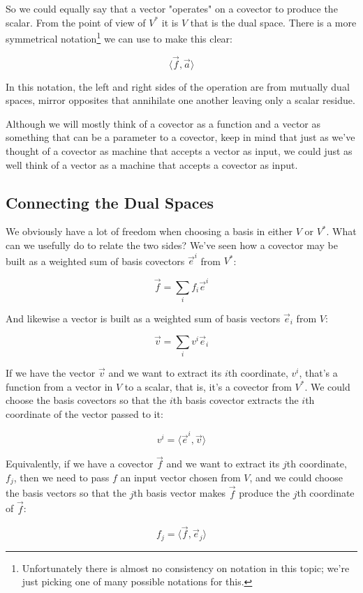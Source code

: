So we could equally say that a vector "operates" on a covector to produce the scalar. From the point of view of $V^*$ it is $V$ that is the dual space. There is a more symmetrical notation\footnote{Unfortunately there is almost no consistency on notation in this topic; we're just picking one of many possible notations for this.} we can use to make this clear:

$$\langle \vec{f},\vec{a}\rangle$$

In this notation, the left and right sides of the operation are from mutually dual spaces, mirror opposites that annihilate one another leaving only a scalar residue.

Although we will mostly think of a covector as a function and a vector as something that can be a parameter to a covector, keep in mind that just as we've thought of a covector as machine that accepts a vector as input, we could just as well think of a vector as a machine that accepts a covector as input.

\subsection{Connecting the Dual Spaces}

We obviously have a lot of freedom when choosing a basis in either $V$ or $V^*$. What can we usefully do to relate the two sides? We've seen how a covector may be built as a weighted sum of basis covectors $\vec{e}^i$ from $V^*$:

$$
\vec{f} = \sum_i f_i \vec{e}^i
$$

And likewise a vector is built as a weighted sum of basis vectors $\vec{e}_i$ from $V$:

$$
\vec{v} = \sum_i v^i \vec{e}_i
$$

If we have the vector $\vec{v}$ and we want to extract its $i$th coordinate, $v^i$, that's a function from a vector in $V$ to a scalar, that is, it's a covector from $V^*$. We could choose the basis covectors so that the $i$th basis covector extracts the $i$th coordinate of the vector passed to it:

$$
v^i = \langle \vec{e}^i , \vec{v} \rangle
$$ 

Equivalently, if we have a covector $\vec{f}$ and we want to extract its $j$th coordinate, $f_j$, then we need to pass $f$ an input vector chosen from $V$, and we could choose the basis vectors so that the $j$th basis vector makes $\vec{f}$ produce the $j$th coordinate of $\vec{f}$:

$$
f_j = \langle \vec{f} , \vec{e}_j\rangle
$$

